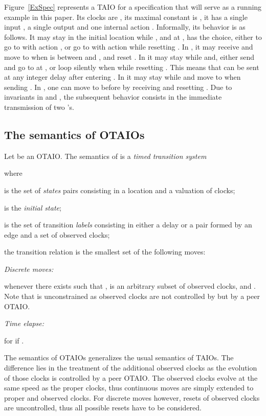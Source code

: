 \documentclass{LMCS}
\theoremstyle{plain}\newtheorem{proposition}[thm]{Proposition}
\begin{document}
\begin{exa}
Figure~\ref{ExSpec} represents a TAIO for a specification 
that will serve as a running example in this paper.
Its clocks are , its maximal constant is , 
it has a single input , 
a single output  and 
one internal action .
Informally, its behavior is as follows.
It may stay in the initial location  while ,
and at , has the choice, either to go to  with action ,
or go to  with action  while resetting .
In , it may receive  and move to  
when  is between  and , and reset .
In  it may stay while  and, 
either send  and go to  at , 
or loop silently when   while resetting .
This means that  can be sent at any integer delay after entering
.
In  it may stay while  and move to  when sending .
In , one can move to  before  by receiving  
and resetting  . Due to invariants  in  and 
, the subsequent behavior consists in the immediate 
transmission of two 's.
\end{exa}

\subsection{The semantics of OTAIOs}
Let
 be an OTAIO.
The semantics of  is a {\it timed transition system}
 
where
\begin{iteMize}{}
\item 
 is the set of {\em states} \ie
pairs  consisting in a location and a valuation of clocks;
\item  is the {\em initial state}; 
\item 
 is the set of transition {\em labels}
consisting in either a delay  or a pair   formed by 
an edge  and a set  of observed clocks;
\item 
the  transition relation 
 is the smallest set of the following moves:
\begin{iteMize}{}
\item
{\em Discrete moves:} 
 
whenever there exists  
such that , 
 is an arbitrary subset of observed clocks, 
 and .
Note that  is unconstrained as observed clocks are not controlled by  but by a peer OTAIO. 
\item
{\em Time elapse:}

for  if  
.
\end{iteMize}
\end{iteMize}\medskip
The semantics of OTAIOs generalizes the usual semantics of TAIOs.
The difference lies in the treatment of the additional observed clocks
as the evolution of those clocks is controlled by a peer OTAIO.
The observed clocks evolve at the same speed as the proper clocks, 
thus continuous moves are simply extended to proper and observed clocks.
For discrete moves however, resets of observed clocks are uncontrolled,
thus all possible resets have to be considered.
\end{document}

